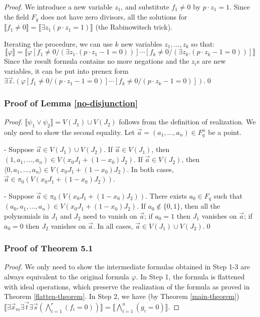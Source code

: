 \documentclass[envcountsect]{llncs}
\begin{document}
{{\begin{proof}
We introduce a new variable $z_1$, and substitute $f_1\neq 0$ by $p\cdot z_1 = 1$. Since the field $F_q$ does not have zero divisors, all the solutions for $\llbracket f_1\neq 0\rrbracket = \llbracket\exists z_1 (p\cdot z_1 =1)\rrbracket$ (the Rabinowitsch trick). 

Iterating the procedure, we can use $k$ new variables $z_1,...,z_k$ so that:
$$\llbracket\varphi\rrbracket = \llbracket \varphi[f_1\neq 0 /(\exists z_1. (p\cdot z_1 -1 = 0))]\cdots [f_k\neq 0 /(\exists z_k. (p\cdot z_k -1 = 0))]\rrbracket$$
 Since the result formula contains no more negations and the $z_i$s are new variables, it can be put into prenex form $\exists \vec z. (\varphi[f_1\neq 0 /(p\cdot z_1 -1 = 0)]\cdots [f_k\neq 0 /(p\cdot z_k -1 = 0)])$.\qed
\end{proof}

\subsubsection{Proof of Lemma \ref{no-disjunction}}
\begin{proof}$\llbracket \psi_1\vee \psi_2 \rrbracket = V(J_1)\cup V(J_2)$ follows from the definition of realization. We only need to show the second equality. Let $\vec a=(a_1,...,a_n)\in F_q^n$ be a point.

- Suppose $\vec a\in V(J_1)\cup V(J_2)$. If $\vec a\in V(J_1)$, then $(1, a_1,...,a_n)\in V(x_0J_1+(1-x_0)J_2)$. If $\vec a\in V(J_2)$, then $\langle 0, a_1,...,a_n\rangle\in V(x_0J_1+(1-x_0)J_2)$. In both cases, $\vec a\in \pi_0(V(x_0J_1+(1-x_0)J_2))$.

- Suppose $\vec a \in \pi_0( V(x_0J_1+(1-x_0)J_2))$. There exists $a_0\in F_q$ such that $( a_0,a_1,...,a_n)\in V(x_0J_1+(1-x_0)J_2)$. If $a_0\not\in \{0,1\}$, then all the polynomials in $J_1$ and $J_2$ need to vanish on $\vec a$; if $a_0=1$ then $J_1$ vanishes on $\vec a$; if  $a_0=0$ then $J_2$ vanishes on $\vec a$. In all cases, $\vec a\in V(J_1)\cup V(J_2)$.\qed
\end{proof}



\subsubsection{Proof of Theorem 5.1}
\begin{proof}
We only need to show the intermediate formulas obtained in Step 1-3 are always equivalent to the original formula $\varphi$. In Step 1, the formula is flattened with ideal operations, which preserve the realization of the formula as proved in Theorem \ref{flatten-theorem}. In Step 2, we have (by Theorem \ref{main-theorem}) $\llbracket \exists \vec x_m\exists \vec t\exists \vec s (\bigwedge_{i=1}^r (f_i = 0))\rrbracket = \llbracket \bigwedge_{i=1}^u (g_i = 0) \rrbracket.$ 


\end{proof}}}
\end{document}
